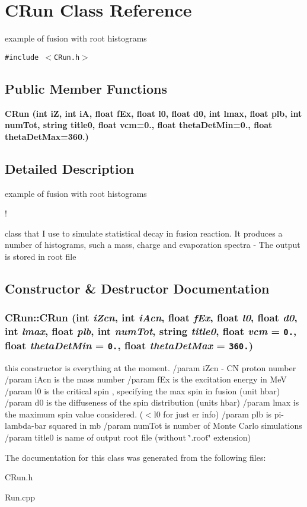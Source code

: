 \section{CRun Class Reference}
\label{classCRun}
example of fusion with root histograms  


{\tt \#include $<$CRun.h$>$}

\subsection*{Public Member Functions}
\begin{CompactItemize}
\item 
\bf{CRun} (int i\-Z, int i\-A, float f\-Ex, float l0, float d0, int lmax, float plb, int num\-Tot, string title0, float vcm=0., float theta\-Det\-Min=0., float theta\-Det\-Max=360.)
\end{CompactItemize}


\subsection{Detailed Description}
example of fusion with root histograms 

!

class that I use to simulate statistical decay in fusion reaction. It produces a number of histograms, such a mass, charge and evaporation spectra - The output is stored in root file 



\subsection{Constructor \& Destructor Documentation}
\subsubsection{\setlength{\rightskip}{0pt plus 5cm}CRun::CRun (int {\em i\-Zcn}, int {\em i\-Acn}, float {\em f\-Ex}, float {\em l0}, float {\em d0}, int {\em lmax}, float {\em plb}, int {\em num\-Tot}, string {\em title0}, float {\em vcm} = {\tt 0.}, float {\em theta\-Det\-Min} = {\tt 0.}, float {\em theta\-Det\-Max} = {\tt 360.})}\label{classCRun_01e26f72913747034ef1d2f76f3b70f7}


this constructor is everything at the moment. /param i\-Zcn - CN proton number /param i\-Acn is the mass number /param f\-Ex is the excitation energy in Me\-V /param l0 is the critical spin , specifying the max spin in fusion (unit hbar) /param d0 is the diffuseness of the spin distribution (units hbar) /param lmax is the maximum spin value considered. ($<$l0 for just er info) /param plb is pi-lambda-bar squared in mb /param num\-Tot is number of Monte Carlo simulations /param title0 is name of output root file (without \char`\"{}.root\char`\"{} extension) 

The documentation for this class was generated from the following files:\begin{CompactItemize}
\item 
CRun.h\item 
Run.cpp\end{CompactItemize}
